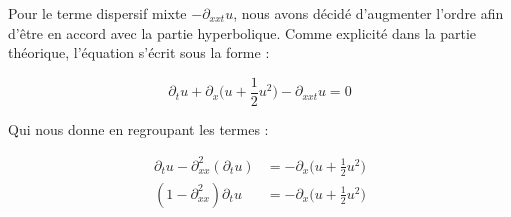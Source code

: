 Pour le terme dispersif mixte $-\partial_{xxt} u$, nous avons décidé d'augmenter l'ordre afin d'être en accord avec la partie hyperbolique. Comme explicité dans la partie théorique, l'équation s'écrit sous la forme :

\begin{equation*}
    \partial_t u + \partial_x \Big(u + \frac{1}{2}u^2\Big) - \partial_{xxt} u = 0
\end{equation*}

Qui nous donne en regroupant les termes :

\begin{align*}
    \partial_t u - \partial_{xx}^2 (\partial_t u) &= -\partial_x \Big(u + \frac{1}{2}u^2\Big)\\
    (1 - \partial_{xx}^2) \partial_t u &= -\partial_x \Big(u + \frac{1}{2}u^2\Big)
\end{align*}


